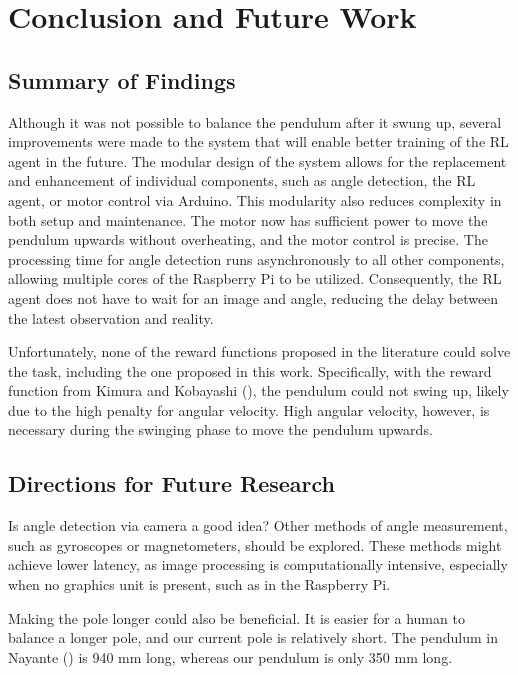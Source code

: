 \chapter{Conclusion and Future Work}

\section{Summary of Findings}
Although it was not possible to balance the pendulum after it swung up, several improvements were made to the system that will enable better training of the RL agent in the future. The modular design of the system allows for the replacement and enhancement of individual components, such as angle detection, the RL agent, or motor control via Arduino. This modularity also reduces complexity in both setup and maintenance. The motor now has sufficient power to move the pendulum upwards without overheating, and the motor control is precise. The processing time for angle detection runs asynchronously to all other components, allowing multiple cores of the Raspberry Pi to be utilized. Consequently, the RL agent does not have to wait for an image and angle, reducing the delay between the latest observation and reality.

Unfortunately, none of the reward functions proposed in the literature could solve the task, including the one proposed in this work. Specifically, with the reward function from Kimura and Kobayashi (\citeyear{kimura_stochastic_1999}), the pendulum could not swing up, likely due to the high penalty for angular velocity. High angular velocity, however, is necessary during the swinging phase to move the pendulum upwards.

\section{Directions for Future Research}
Is angle detection via camera a good idea? Other methods of angle measurement, such as gyroscopes or magnetometers, should be explored. These methods might achieve lower latency, as image processing is computationally intensive, especially when no graphics unit is present, such as in the Raspberry Pi.

Making the pole longer could also be beneficial. It is easier for a human to balance a longer pole, and our current pole is relatively short. The pendulum in Nayante (\citeyear{nayante_reinforcement_2021}) is 940 mm long, whereas our pendulum is only 350 mm long.

